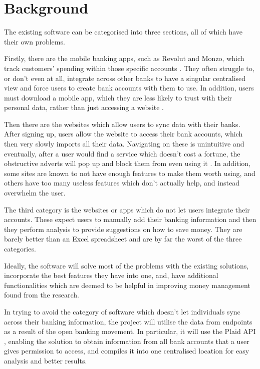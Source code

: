 \section{Background}
The existing software can be categorised into three sections, all of which have their own problems. 

Firstly, there are the mobile banking apps, such as Revolut and Monzo, which track customers' spending within those specific accounts \cite{RevolutBudgetting} \cite{MonzoBudgetting}. They often struggle to, or don't even at all, integrate across other banks to have a singular centralised view and force users to create bank accounts with them to use. In addition, users must download a mobile app, which they are less likely to trust with their personal data, rather than just accessing a website \cite{AppVsWebsite}.

Then there are the websites which allow users to sync data with their banks. After signing up, users allow the website to access their bank accounts, which then very slowly imports all their data. Navigating on these is unintuitive and eventually, after a user would find a service which doesn't cost a fortune, the obstructive adverts will pop up and block them from even using it \cite{PersonalFinanceAppsComparison}. In addition, some sites are known to not have enough features to make them worth using, and others have too many useless features which don't actually help, and instead overwhelm the user.

The third category is the websites or apps which do not let users integrate their accounts. These expect users to manually add their banking information and then they perform analysis to provide suggestions on how to save money. They are barely better than an Excel spreadsheet and are by far the worst of the three categories.

Ideally, the software will solve most of the problems with the existing solutions, incorporate the best features they have into one, and, have additional functionalities which are deemed to be helpful in improving money management found from the research.

In trying to avoid the category of software which doesn't let individuals sync across their banking information, the project will utilise the data from endpoints as a result of the open banking movement. In particular, it will use the Plaid API \cite{Plaid}, enabling the solution to obtain information from all bank accounts that a user gives permission to access, and compiles it into one centralised location for easy analysis and better results.                                                                           